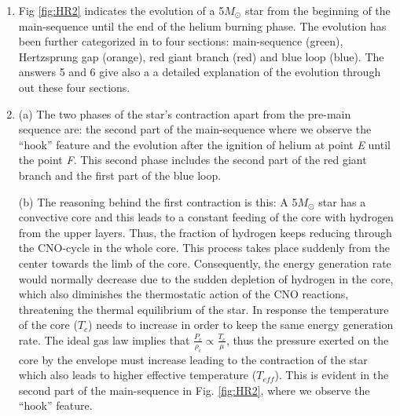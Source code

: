 \documentclass{article}
\newcommand{\msun}{\ensuremath{M_\odot}}
\begin{document}
\begin{enumerate}
    
    \item Fig \ref{fig:HR2} indicates the evolution of a 5$\msun$ star from the beginning of the main-sequence until the end of the helium burning phase. The evolution has been further categorized in to four sections: main-sequence (green), Hertzsprung gap (orange), red giant branch (red) and blue loop (blue). The answers 5 and 6 give also a a detailed explanation of the evolution through out these four sections.

    
    \item  (a) The two phases of the star's contraction apart from the pre-main sequence are: the second part of the main-sequence where we observe the ``hook'' feature and the evolution after the ignition of helium at point {\it E} until the point {\it F}. This second phase includes the second part of the red giant branch and the first part of the blue loop. 
    
    (b) The reasoning behind the first contraction is this:  A 5$\msun$ star has a convective core and this leads to a constant feeding of the core with hydrogen from the upper layers. Thus, the fraction of hydrogen keeps reducing through the CNO-cycle in the whole core. This process takes place suddenly from the center towards the limb of the core. Consequently, the energy generation rate would normally decrease due to the sudden depletion of hydrogen in the core, which also diminishes the thermostatic action of the CNO reactions, threatening the thermal equilibrium of the star. In response the temperature of the core ($T_c$) needs to increase in order to keep the same energy generation rate. The ideal gas law implies that $\frac{P_c}{\rho_c} \propto \frac{T_c}{\mu}$, thus the pressure exerted on the core by the envelope must increase leading to the contraction of the star which also leads to higher effective temperature ($T_{eff}$). This is evident in the second part of the main-sequence in Fig. \ref{fig:HR2}, where we observe the ``hook'' feature. 
    

\end{enumerate}
\end{document}
